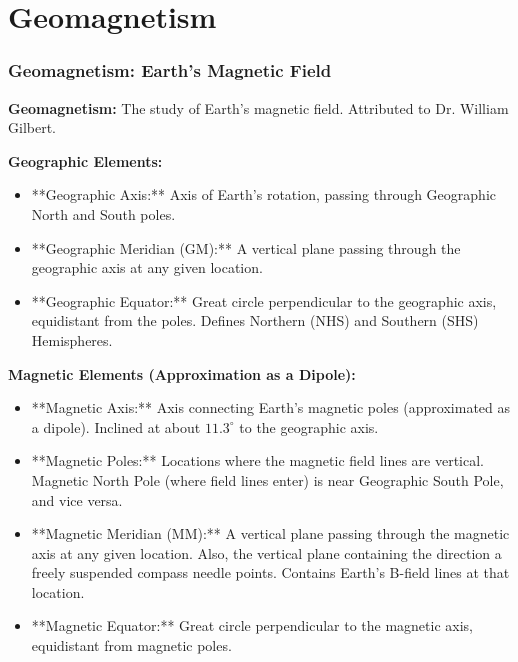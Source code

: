 \section{Geomagnetism}

\transfade[duration=0.5]

\begin{frame}[t]
    \frametitle{\textcolor{deepnavy}{\textbf{Geomagnetism: Earth's Magnetic Field}}}
    \renewcommand{\familydefault}{\rmdefault}
    \small

      \item<+-> \textbf{Geomagnetism:} The study of Earth's magnetic field.   Attributed to Dr. William Gilbert.

    \item<+-> \textbf{Geographic Elements:}
        \begin{itemize}[<+->]
              \item **Geographic Axis:** Axis of Earth's rotation, passing through Geographic North and South poles.
              \item **Geographic Meridian (GM):** A vertical plane passing through the geographic axis at any given location.
              \item **Geographic Equator:** Great circle perpendicular to the geographic axis, equidistant from the poles.   Defines Northern (NHS) and Southern (SHS) Hemispheres.
        \end{itemize}

    \item<+-> \textbf{Magnetic Elements (Approximation as a Dipole):}
        \begin{itemize}[<+->]
            \item **Magnetic Axis:** Axis connecting Earth's magnetic poles (approximated as a dipole).   Inclined at about $11.3^\circ$ to the geographic axis.
            \item **Magnetic Poles:** Locations where the magnetic field lines are vertical. Magnetic North Pole (where field lines enter) is near Geographic South Pole, and vice versa.
              \item **Magnetic Meridian (MM):** A vertical plane passing through the magnetic axis at any given location.   Also, the vertical plane containing the direction a freely suspended compass needle points.   Contains Earth's B-field lines at that location.
              \item **Magnetic Equator:** Great circle perpendicular to the magnetic axis, equidistant from magnetic poles.
        \end{itemize} %
\end{frame}

